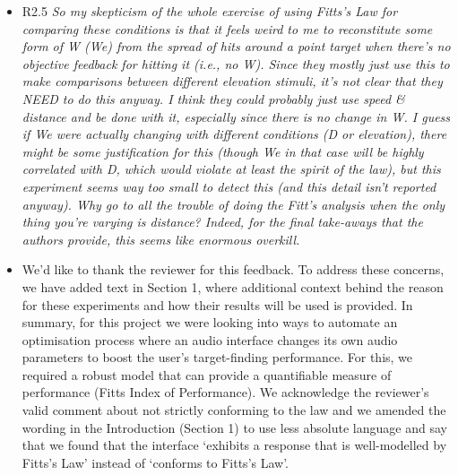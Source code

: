 \documentclass{scrartcl}
\begin{document}
\begin{itemize}
  \item R2.5 \textit{So my skepticism of the whole exercise of using Fitts’s Law for comparing these conditions is that it feels weird to me to reconstitute some form of W (We) from the spread of hits around a point target when there’s no objective feedback for hitting it (i.e., no W). Since they mostly just use this to make comparisons between different elevation stimuli, it’s not clear that they NEED to do this anyway. I think they could probably just use speed \& distance and be done with it, especially since there is no change in W. I guess if We were actually changing with different conditions (D or elevation), there might be some justification for this (though We in that case will be highly correlated with D, which would violate at least the spirit of the law), but this experiment seems way too small to detect this (and this detail isn’t reported anyway). Why go to all the trouble of doing the Fitt’s analysis when the only thing you’re varying is distance? Indeed, for the final take-aways that the authors provide, this seems like enormous overkill.}
  \item[] We'd like to thank the reviewer for this feedback.
    To address these concerns, we have added text in Section 1, where additional context behind the reason for these experiments and how their results will be used is provided. 
    In summary, for this project we were looking into ways to automate an optimisation process where an audio interface changes its own audio parameters to boost the user's target-finding performance.
    For this, we required a robust model that can provide a quantifiable measure of performance (Fitts Index of Performance).
    We acknowledge the reviewer's valid comment about not strictly conforming to the law and we amended the wording in the Introduction (Section 1) to use less absolute language and say that we found that the interface `exhibits a response that is well-modelled by Fitts’s Law'  instead of `conforms to Fitts's Law'.


\end{itemize}
\end{document}
